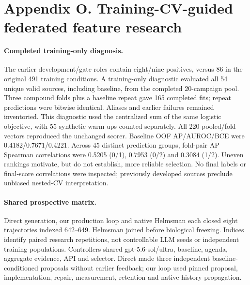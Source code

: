 \section*{Appendix O. Training-CV-guided federated feature research}
\label{app:federated-cv}
\renewcommand{\thetable}{O.\arabic{table}}
\renewcommand{\theHtable}{O.\arabic{table}}
\setcounter{table}{0}

\begin{table}[ht]

\end{table}

\paragraph{Completed training-only diagnosis.}
The earlier development/gate roles contain eight/nine positives, versus 86 in the original 491 training conditions. A training-only diagnostic evaluated all 54 unique valid sources, including baseline, from the completed 20-campaign pool. Three compound folds plus a baseline repeat gave 165 completed fits; repeat predictions were bitwise identical. Aliases and earlier failures remained inventoried. This diagnostic used the centralized sum of the same logistic objective, with 55 synthetic warm-ups counted separately. All 220 pooled/fold vectors reproduced the unchanged scorer. Baseline OOF AP/AUROC/BCE were 0.4182/0.7671/0.4221. Across 45 distinct prediction groups, fold-pair AP Spearman correlations were 0.5205 (0/1), 0.7953 (0/2) and 0.3084 (1/2). Uneven rankings motivate, but do not establish, more reliable selection. No final labels or final-score correlations were inspected; previously developed sources preclude unbiased nested-CV interpretation.

\paragraph{Shared prospective matrix.}
Direct generation, our production loop and native Helmsman each closed eight trajectories indexed 642--649. Helmsman joined before biological freezing. Indices identify paired research repetitions, not controllable LLM seeds or independent training populations. Controllers shared gpt-5.6-sol/ultra, baseline, agenda, aggregate evidence, API and selector. Direct made three independent baseline-conditioned proposals without earlier feedback; our loop used pinned proposal, implementation, repair, measurement, retention and native history propagation.

